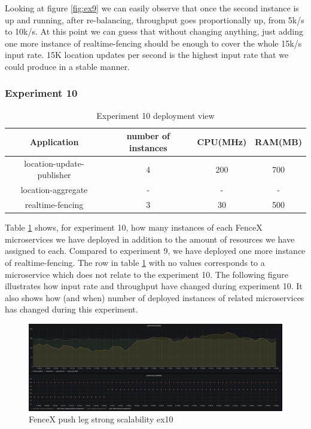 \documentclass[a4]{report}
\begin{document}
    \clearpage

    Looking at figure \ref{fig:ex9} we can easily observe that once the second instance is up and running, after
    re-balancing, throughput goes proportionally up, from 5k/s to 10k/s.
    At this point we can guess that without changing anything, just adding one more instance of realtime-fencing
    should be enough to cover the whole 15k/s input rate.
    15K location updates per second is the highest input rate that we could produce in a stable manner.

    \subsubsection{Experiment 10}
    \begin{table}[h!]
        \centering
        \begin{tabular}{|c|c|c|c|}
            \hline
            Application               & number of instances & CPU(MHz) & RAM(MB) \\
            \hline
            location-update-publisher & 4                   & 200      & 700     \\
            location-aggregate        & -                   & -        & -       \\
            realtime-fencing          & 3                   & 30       & 500     \\
            \hline
        \end{tabular}
        \caption{Experiment 10 deployment view}
        \label{table:ex10-dv}
    \end{table}

    Table \ref{table:ex10-dv} shows, for experiment 10, how many instances of each FenceX microservices we have
    deployed in addition to the amount of resources we have assigned to each.
    Compared to experiment 9, we have deployed one more instance of realtime-fencing.
    The row in table \ref{table:ex10-dv} with no values corresponds to a microservice which does not relate to the experiment 10.
    The following figure illustrates how input rate and throughput have changed during experiment 10.
    It also shows how (and when) number of deployed instances of related microservices has changed during this
    experiment.

    \begin{figure}
        \caption{FenceX push leg strong scalability ex10}
        \label{fig:ex10}
        \includegraphics[scale=0.5]{images/evaluation/ex10-benchmarking-ongoing-2per4sec.png}
    \end{figure}
\end{document}
